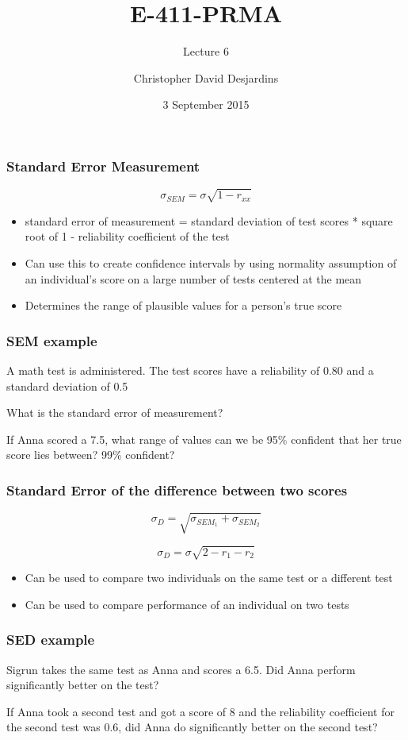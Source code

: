 \documentclass[dvipsnames]{beamer}\usepackage[]{graphicx}\usepackage[]{color}
\title{E-411-PRMA}
\subtitle{Lecture 6}
\author{Christopher David Desjardins}
\date{3 September 2015}
\begin{document}
\frame{\titlepage}

\begin{frame}
\frametitle{Standard Error Measurement}
$$\sigma_{SEM} = \sigma\sqrt{1 - r_{xx}}$$
\begin{itemize}
\item standard error of measurement = standard deviation of test scores * square root of 1 - reliability coefficient of the test
  \item<2->Can use this to create confidence intervals by using normality assumption of an individual's score on a large number of tests centered at the mean
  \item<2-> Determines the range of plausible values for a person's true score
\end{itemize}
\end{frame}

\begin{frame}
\frametitle{SEM example}

A math test is administered. The test scores have a reliability of 0.80 and a standard deviation of 0.5

\vspace{1cm}
What is the standard error of measurement?

\vspace{1cm}
If Anna scored a 7.5, what range of values can we be 95\% confident that her true score lies between? 99\% confident?
\end{frame}

\begin{frame}
\frametitle{Standard Error of the difference between two scores}
$$\sigma_D = \sqrt{\sigma_{SEM_1} + \sigma_{SEM_2}} $$

$$\sigma_D = \sigma\sqrt{2 - r_1 - r_2} $$

\begin{itemize}
  \item Can be used to compare two individuals on the same test or a different test
  \item Can be used to compare performance of an individual on two tests
\end{itemize}
\end{frame}

\begin{frame}
\frametitle{SED example}
Sigrun takes the same test as Anna and scores a 6.5. Did Anna perform significantly better on the test? 

\vspace{1cm}
If Anna took a second test and got a score of 8 and the reliability coefficient for the second test was 0.6, did Anna do significantly better on the second test?

\end{frame}
\end{document}
